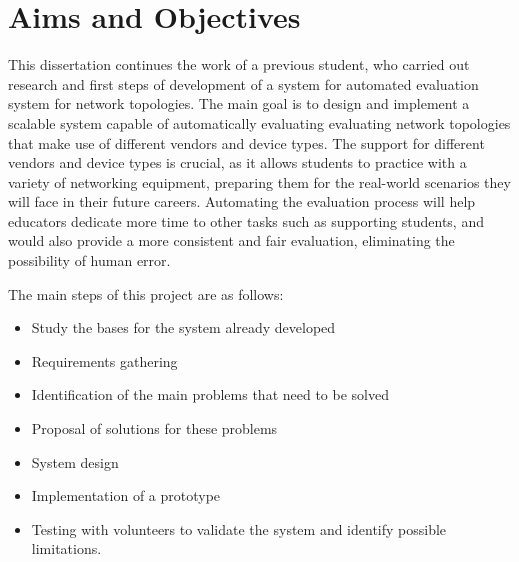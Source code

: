 \section{Aims and Objectives}
This dissertation continues the work of a previous student, who carried out research and first steps of development of a 
system for automated evaluation system for network topologies. The main goal is to design and implement a scalable system 
capable of automatically evaluating evaluating network topologies that make use of different vendors and device types.
The support for different vendors and device types is crucial, as it allows students to practice with a variety of
networking equipment, preparing them for the real-world scenarios they will face in their future careers.
Automating the evaluation process will help educators dedicate more time to other tasks such as supporting students, and
would also provide a more consistent and fair evaluation, eliminating the possibility of human error.


The main steps of this project are as follows:

\begin{itemize}
    \item Study the bases for the system already developed
    \item Requirements gathering
    \item Identification of the main problems that need to be solved
    \item Proposal of solutions for these problems
    \item System design
    \item Implementation of a prototype
    \item Testing with volunteers to validate the system and identify possible limitations.
  \end{itemize}
